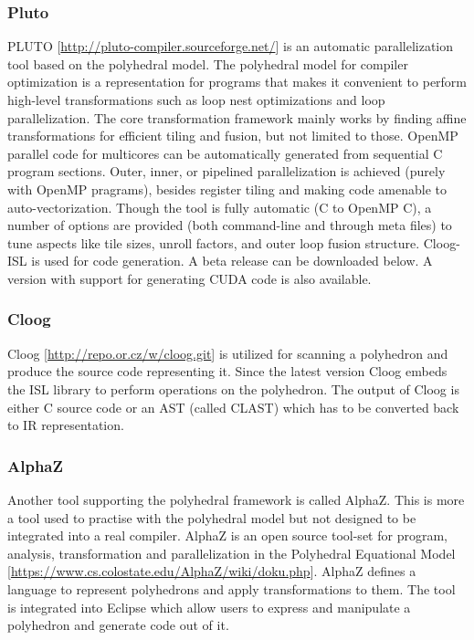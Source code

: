 \subsubsection{Pluto} 
PLUTO [\url{http://pluto-compiler.sourceforge.net/}] is an automatic parallelization tool based on the
polyhedral model. The polyhedral model for compiler optimization is a
representation for programs that makes it convenient to perform high-level
transformations such as loop nest optimizations and loop parallelization. 
The core transformation framework mainly works by
finding affine transformations for efficient tiling and fusion, but not limited
to those. OpenMP parallel code for multicores can be automatically generated
from sequential C program sections. Outer, inner, or pipelined parallelization
is achieved (purely with OpenMP pragrams), besides register tiling and making
code amenable to auto-vectorization. Though the tool is fully automatic (C to
OpenMP C), a number of options are provided (both command-line and
through meta files) to tune aspects like tile sizes, unroll factors,
and outer loop fusion structure. Cloog-ISL is used for code generation.
A beta release can be downloaded below. A version with support for
generating CUDA code is also available.

\subsubsection{Cloog}
Cloog [\url{http://repo.or.cz/w/cloog.git}] is utilized for scanning a
polyhedron and produce the source code representing it. Since the latest version
Cloog embeds the ISL library to perform operations on the polyhedron. The output
of Cloog is either C source code or an AST (called CLAST) which has to be
converted back to IR representation. 


\subsubsection{AlphaZ}
Another tool supporting the polyhedral framework is called AlphaZ. This is more
a tool used to practise with the polyhedral model but not designed to be
integrated into a real compiler. AlphaZ is an open source tool-set for program,
analysis, transformation and parallelization in the Polyhedral
Equational Model [\url{https://www.cs.colostate.edu/AlphaZ/wiki/doku.php}].
AlphaZ defines a language to represent polyhedrons and apply transformations to
them. The tool is integrated into Eclipse which allow users to express and
manipulate a polyhedron and generate code out of it. 


